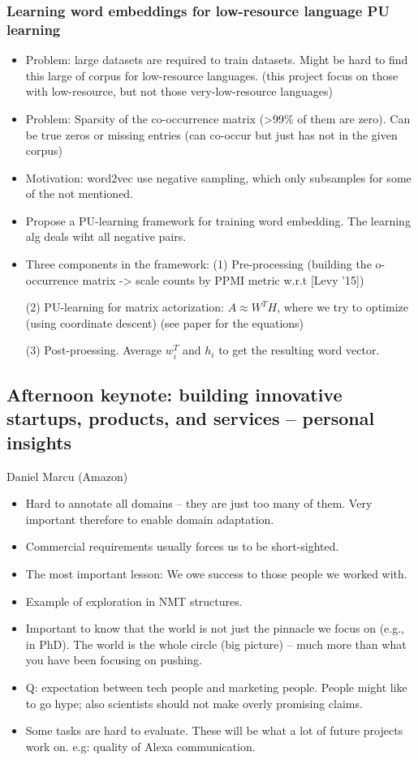 
\subsubsection{Learning word embeddings for low-resource language PU learning \cite{Jiang2018Learning}}
\begin{itemize}
	\item Problem: large datasets are required to train datasets. Might be hard to find this large of corpus for low-resource languages. (this project focus on those with low-resource, but not those very-low-resource languages)
	\item Problem: Sparsity of the co-occurrence matrix (>99\% of them are zero). Can be true zeros or missing entries (can co-occur but just has not in the given corpus)
	\item Motivation: word2vec use negative sampling, which only subsamples for some of the not mentioned.
	\item Propose a PU-learning framework for training word embedding. The learning alg deals wiht all negative pairs.
	\item Three components in the framework: 
	(1) Pre-processing (building the o-occurrence matrix -> scale counts by PPMI metric w.r.t [Levy '15]) 
	
	(2) PU-learning for matrix actorization: $A \approx W^T H$, where we try to optimize (using coordinate descent)
	(see paper for the equations)
	
	(3) Post-proessing. Average $w_i^T$ and $h_i$ to get the resulting word vector.
\end{itemize}


\subsection{Afternoon keynote: building innovative startups, products, and services -- personal insights}
Daniel Marcu (Amazon)
\begin{itemize}
	\item Hard to annotate all domains -- they are just too many of them. Very important therefore to enable domain adaptation.
	\item Commercial requirements usually forces us to be short-sighted.
	\item The most important lesson: We owe success to those people we worked with.
	\item Example of exploration in NMT structures.
	\item Important to know that the world is not just the pinnacle we focus on (e.g., in PhD). The world is the whole circle (big picture) -- much more than what you have been focusing on pushing.
	\item Q: expectation between tech people and marketing people. People might like to go hype; also scientists should not make overly promising claims.
	\item Some tasks are hard to evaluate. These will be what a lot of future projects work on. e.g: quality of Alexa communication.
\end{itemize}

